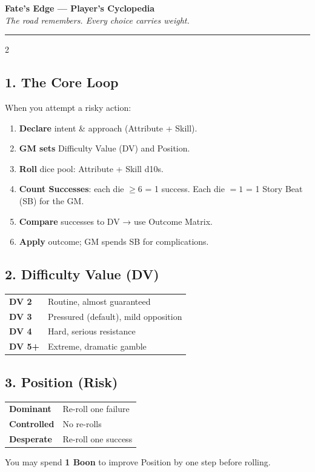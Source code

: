 \documentclass[10pt,landscape]{article}
\begin{document}
\begin{center}
{\huge \textbf{Fate's Edge --- Player's Cyclopedia}} \\[0.2em]
\small \textit{The road remembers. Every choice carries weight.}
\end{center}
\vspace{-0.5ex}
\hrule
\vspace{1ex}
\begin{multicols}{2}

\subsection*{1. The Core Loop}
When you attempt a risky action:
\begin{enumerate}
    \item \textbf{Declare} intent \& approach (Attribute + Skill).
    \item \textbf{GM sets} Difficulty Value (DV) and Position.
    \item \textbf{Roll} dice pool: Attribute + Skill d10s.
    \item \textbf{Count Successes}: each die $\ge 6$ = 1 success. Each die $=1$ = 1 Story Beat (SB) for the GM.
    \item \textbf{Compare} successes to DV → use Outcome Matrix.
    \item \textbf{Apply} outcome; GM spends SB for complications.
\end{enumerate}

\subsection*{2. Difficulty Value (DV)}
\begin{tabularx}{\linewidth}{@{} l X @{}}
\textbf{DV 2} & Routine, almost guaranteed \\
\textbf{DV 3} & Pressured (default), mild opposition \\
\textbf{DV 4} & Hard, serious resistance \\
\textbf{DV 5+} & Extreme, dramatic gamble \\
\end{tabularx}

\subsection*{3. Position (Risk)}
\begin{tabularx}{\linewidth}{@{} l X @{}}
\textbf{Dominant}   & Re-roll one failure \\
\textbf{Controlled} & No re-rolls \\
\textbf{Desperate}  & Re-roll one success \\
\end{tabularx}
\vspace{0.5ex}
You may spend \textbf{1 Boon} to improve Position by one step before rolling.


\end{multicols}
\end{document}
